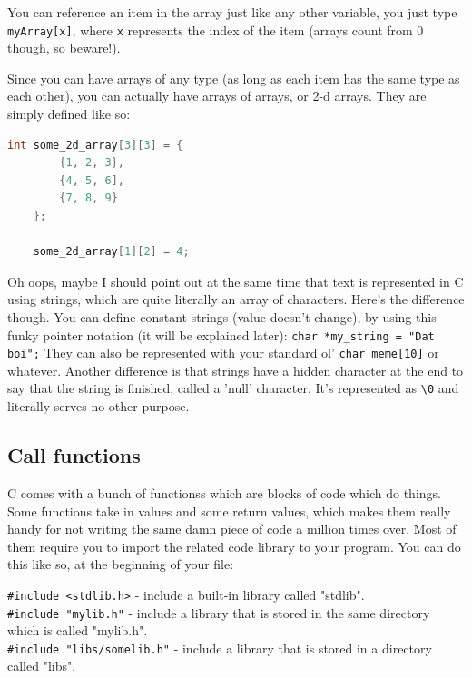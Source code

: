 You can reference an item in the array just like any other variable, you just type \texttt{myArray[x]}, where \texttt{x} represents the index of the item (arrays count from 0 though, so beware!).

Since you can have arrays of any type (as long as each item has the same type as each other), you can actually have arrays of arrays, or 2-d arrays. They are simply defined like so:
\begin{lstlisting}[language=C]
    int some_2d_array[3][3] = {
        {1, 2, 3},
        {4, 5, 6],
        {7, 8, 9}
    };

    some_2d_array[1][2] = 4;
\end{lstlisting}

Oh oops, maybe I should point out at the same time that text is represented in C using \glspl{string}, which are quite literally an array of characters. Here's the difference though. You can define \gls{constant} strings (value doesn't change), by using this funky pointer notation (it will be explained later): \texttt{char *my\_string = "Dat boi";} They can also be represented with your standard ol' \texttt{char meme[10]} or whatever. Another difference is that strings have a hidden character at the end to say that the string is finished, called a 'null' character. It's represented as \texttt{\textbackslash0} and literally serves no other purpose.

\subsection{Call functions}
C comes with a bunch of \glspl{functions} which are blocks of code which do things. Some functions take in values and some return values, which makes them really handy for not writing the same damn piece of code a million times over. Most of them require you to import the related code \gls{library} to your program. You can do this like so, at the beginning of your file:

\begin{centering}
    \texttt{#include <stdlib.h>} - include a built-in library called "stdlib".\\
    \texttt{#include "mylib.h"} - include a library that is stored in the same directory which is called "mylib.h".\\
    \texttt{#include "libs/somelib.h"} - include a library that is stored in a directory called "libs".
\end{centering}

